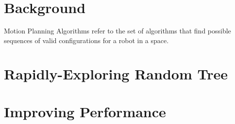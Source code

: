 
\section{Background}
Motion Planning Algorithms refer to the set of algorithms that find possible sequences of valid configurations for a robot in a space.
\newline
\newline
{}

\section{Rapidly-Exploring Random Tree}
    

\section{Improving Performance}